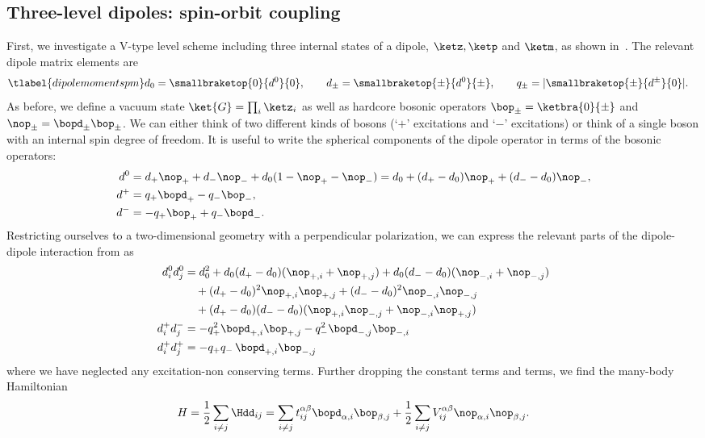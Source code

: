 \subsection{Three-level dipoles: spin-orbit coupling}
First, we investigate a \textsf{V}-type level scheme including three internal states of a dipole, $\ketz, \ketp$ and $\ketm$, as shown in~. The relevant dipole matrix elements are
\begin{align} \tlabel{dipolemomentspm}
    d_0 = \smallbraketop{0}{d^0}{0}, \qquad
    d_\pm = \smallbraketop{\pm}{d^0}{\pm}, \qquad
    q_\pm &= |\smallbraketop{\pm}{d^\pm}{0}|.
\end{align}
As before, we define a vacuum state $\ket{G}=\prod_i \ketz_i$ as well as hardcore bosonic operators $\bop_\pm=\ketbra{0}{{\pm}}$ and $\nop_{\pm}=\bopd_{\pm}\bop_{\pm}$. We can either think of two different kinds of bosons (`$+$' excitations and `$-$' excitations) or think of a single boson with an internal spin degree of freedom. It is useful to write the spherical components of the dipole operator in terms of the bosonic operators:
\begin{align}
    d^0 &= d_+ \nop_+ + d_- \nop_- + d_0 (1-\nop_+-\nop_-) = d_0 + (d_+-d_0) \nop_+ + (d_--d_0) \nop_-, \\
    d^+ &= q_+ \bopd_+ - q_- \bop_-, \\
    d^- &= - q_+ \bop_+  + q_- \bopd_-.
\end{align}
Restricting ourselves to a two-dimensional geometry with a perpendicular polarization, we can express the relevant parts of the dipole-dipole interaction from  as
\begin{align}
    d^0_i d^0_j &= d_0^2 + d_0(d_+-d_0) (\nop_{+,i}+\nop_{+,j}) + d_0(d_--d_0) (\nop_{-,i}+\nop_{-,j}) \\
                &\quad + (d_+ - d_0)^2 \nop_{+,i} \nop_{+,j} + (d_- - d_0)^2 \nop_{-,i} \nop_{-,j} \\
                &\quad + (d_+ - d_0)(d_- - d_0) (\nop_{+,i} \nop_{-,j} + \nop_{-,i} \nop_{+,j}) \\
    d^+_i d^-_j &= - q_+^2 \bopd_{+,i} \bop_{+,j} - q_-^2 \bopd_{-,j} \bop_{-,i} \\
    d^+_i d^+_j &= - q_+q_- \, \bopd_{+,i} \bop_{-,j}
\end{align}
where we have neglected any excitation-non conserving terms. Further dropping the constant terms and  terms, we find the many-body Hamiltonian
\begin{align}
    H = \frac{1}{2} \sum_{i\ne j} \Hdd_{ij} = \sum_{i\ne j}  t_{ij}^{\alpha\beta} \bopd_{\alpha,i} \bop_{\beta,j}
    +\frac{1}{2}\sum_{i\ne j} V_{ij}^{\alpha\beta} \nop_{\alpha,i} \nop_{\beta,j}.
\end{align}
